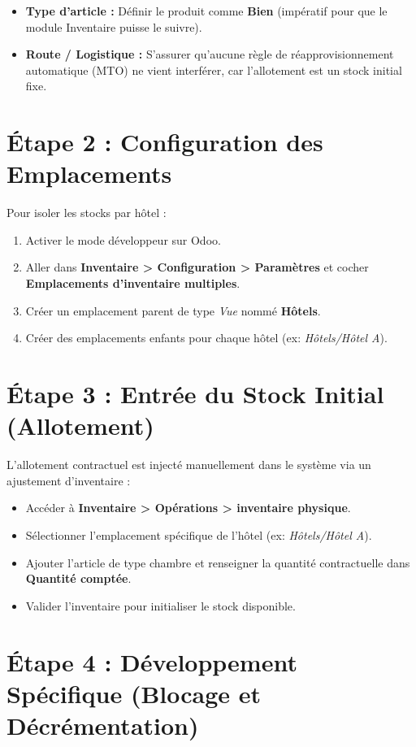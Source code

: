 \documentclass[11pt,a4paper]{report}
\begin{document}
\begin{itemize}
    \item \textbf{Type d'article :} Définir le produit comme \textbf{Bien} (impératif pour que le module Inventaire puisse le suivre).
    \item \textbf{Route / Logistique :} S'assurer qu'aucune règle de réapprovisionnement automatique (MTO) ne vient interférer, car l'allotement est un stock initial fixe.
\end{itemize}


\section{Étape 2 : Configuration des Emplacements}

Pour isoler les stocks par hôtel :

\begin{enumerate}
    \item Activer le mode développeur sur Odoo.
    \item Aller dans \textbf{Inventaire > Configuration > Paramètres} et cocher \textbf{Emplacements d'inventaire multiples}.
    \item Créer un emplacement parent de type \textit{Vue} nommé \textbf{Hôtels}.
    \item Créer des emplacements enfants pour chaque hôtel (ex: \textit{Hôtels/Hôtel A}).
\end{enumerate}


\section{Étape 3 : Entrée du Stock Initial (Allotement)}

L'allotement contractuel est injecté manuellement dans le système via un ajustement d'inventaire :

\begin{itemize}
    \item Accéder à \textbf{Inventaire > Opérations > inventaire physique}.
    \item Sélectionner l'emplacement spécifique de l'hôtel (ex: \textit{Hôtels/Hôtel A}).
    \item Ajouter l'article de type chambre et renseigner la quantité contractuelle dans \textbf{Quantité comptée}.
    \item Valider l'inventaire pour initialiser le stock disponible.
\end{itemize}


\section{Étape 4 : Développement Spécifique (Blocage et Décrémentation)}
\end{document}
